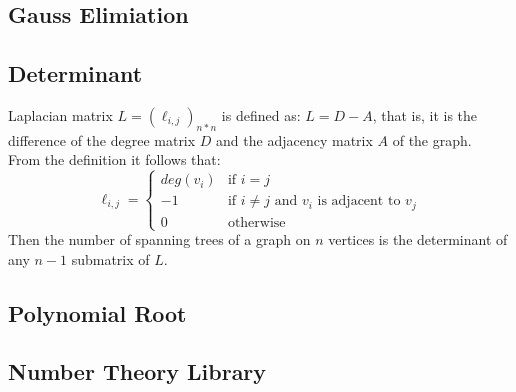 \documentclass[10pt]{article}
\begin{document}
\subsection{Gauss Elimiation}

\subsection{Determinant}

Laplacian matrix $L=(\ell_{i,j})_{n*n}$ is defined as: $L=D-A$, that is, it is the difference of the degree matrix $D$ and the adjacency matrix $A$ of the graph. \\
From the definition it follows that:
\begin{displaymath}
\ell_{i,j}=
\left\{ \begin{array}{ll}
deg(v_i) & \textrm{if } i=j \\
-1 & \textrm{if }i\ne j\textrm{ and }v_i\textrm{ is adjacent to }v_j \\
0 & \textrm{otherwise}
\end{array} \right.
\end{displaymath}
Then the number of spanning trees of a graph on $n$ vertices is the determinant of any $n-1$ submatrix of $L$.
\subsection{Polynomial Root}

\subsection{Number Theory Library}

\end{document}

